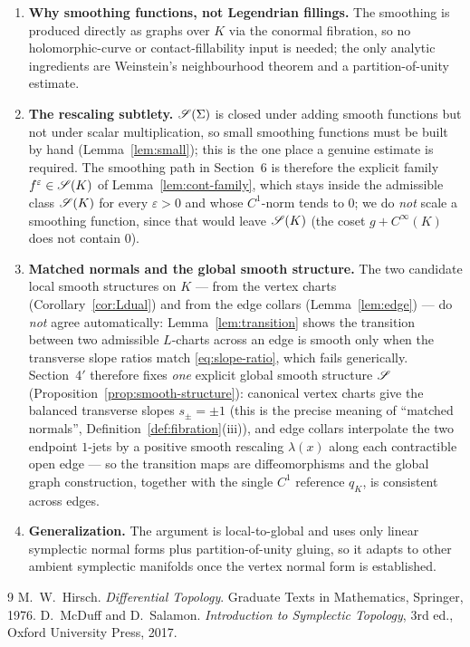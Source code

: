 \begin{enumerate}\setlength\itemsep{4pt}
\item \textbf{Why smoothing functions, not Legendrian fillings.} The smoothing is
produced directly as graphs over $K$ via the conormal fibration, so no
holomorphic-curve or contact-fillability input is needed; the only analytic
ingredients are Weinstein's neighbourhood theorem and a partition-of-unity
estimate.
\item \textbf{The rescaling subtlety.} $\mathscr S(\Sigma)$ is closed under adding
smooth functions but not under scalar multiplication, so small smoothing
functions must be built by hand (Lemma~\ref{lem:small}); this is the one place a
genuine estimate is required. The smoothing path in Section~6 is therefore the
explicit family $f^\varepsilon\in\mathscr S(K)$ of Lemma~\ref{lem:cont-family}, which
stays inside the admissible class $\mathscr S(K)$ for every $\varepsilon>0$ and whose
$C^1$-norm tends to $0$; we do \emph{not} scale a smoothing function, since that
would leave $\mathscr S(K)$ (the coset $g+C^\infty(K)$ does not contain $0$).
\item \textbf{Matched normals and the global smooth structure.} The two
candidate local smooth structures on $K$ --- from the vertex charts
(Corollary~\ref{cor:Ldual}) and from the edge collars (Lemma~\ref{lem:edge}) ---
do \emph{not} agree automatically: Lemma~\ref{lem:transition} shows the transition
between two admissible $L$-charts across an edge is smooth only when the transverse
slope ratios match \eqref{eq:slope-ratio}, which fails generically. Section~4$'$
therefore fixes \emph{one} explicit global smooth structure
$\mathscr S$ (Proposition~\ref{prop:smooth-structure}): canonical vertex charts give the
balanced transverse slopes $s_\pm=\pm1$ (this is the precise meaning of
``matched normals'', Definition~\ref{def:fibration}(iii)), and edge collars
interpolate the two endpoint $1$-jets by a positive smooth rescaling $\lambda(x)$
along each contractible open edge --- so the transition maps are diffeomorphisms
and the global graph construction, together with the single $C^1$ reference $q_K$,
is consistent across edges.
\item \textbf{Generalization.} The argument is local-to-global and uses only
linear symplectic normal forms plus partition-of-unity gluing, so it adapts to
other ambient symplectic manifolds once the vertex normal form is established.
\end{enumerate}

\begin{thebibliography}{9}
 M.~W.~Hirsch.
  \emph{Differential Topology}. Graduate Texts in Mathematics, Springer, 1976.
 D.~McDuff and D.~Salamon.
  \emph{Introduction to Symplectic Topology}, 3rd ed.,
  Oxford University Press, 2017.
\end{thebibliography}

\endgroup

